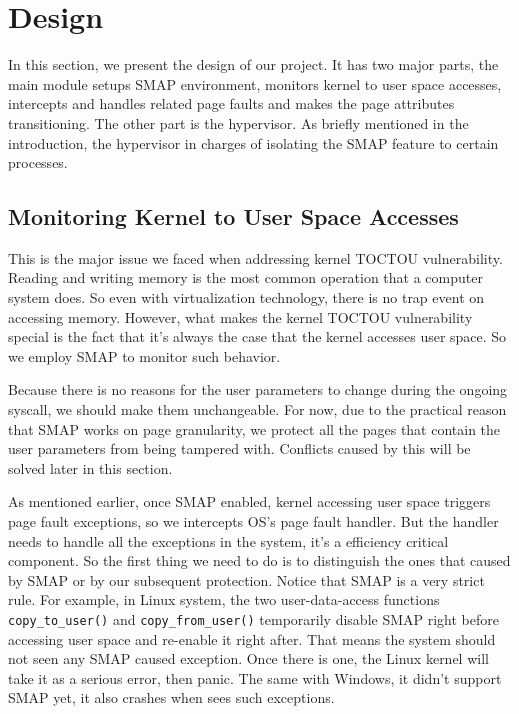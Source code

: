
\section{Design}
\label{sec:design}

In this section, we present the design of our project. It has two major parts, the main module setups SMAP environment, monitors kernel to user space accesses, intercepts and handles related page faults and makes the page attributes transitioning. The other part is the hypervisor. As briefly mentioned in the introduction, the hypervisor in charges of isolating the SMAP feature to certain processes.

\subsection{Monitoring Kernel to User Space Accesses}

This is the major issue we faced when addressing kernel TOCTOU vulnerability. Reading and writing memory is the most common operation that a computer system does. So even with virtualization technology, there is no trap event on accessing memory. However, what makes the kernel TOCTOU vulnerability special is the fact that it's always the case that the kernel accesses user space. So we employ SMAP to monitor such behavior. 

Because there is no reasons for the user parameters to change during the ongoing syscall, we should make them unchangeable. For now, due to the practical reason that SMAP works on page granularity, we protect all the pages that contain the user parameters from being tampered with. Conflicts caused by this will be solved later in this section.

As mentioned earlier, once SMAP enabled, kernel accessing user space triggers page fault exceptions, so we intercepts OS's page fault handler. But the handler needs to handle all the exceptions in the system, it's a efficiency critical component. So the first thing we need to do is to distinguish the ones that caused by SMAP or by our subsequent protection. Notice that SMAP is a very strict rule. For example, in Linux system, the two user-data-access functions \texttt{copy\_to\_user()} and \texttt{copy\_from\_user()} temporarily disable SMAP right before accessing user space and re-enable it right after. That means the system should not seen any SMAP caused exception. Once there is one, the Linux kernel will take it as a serious error, then panic. The same with Windows, it didn't support SMAP yet, it also crashes when sees such exceptions.

